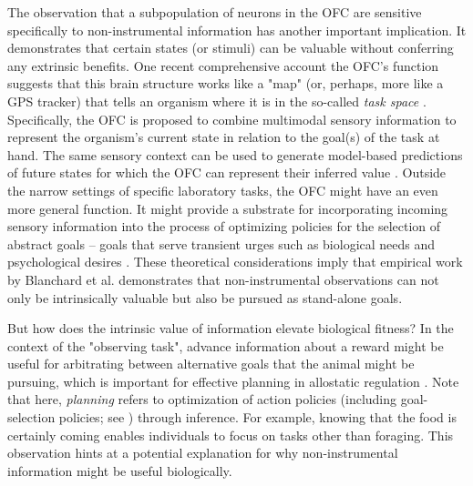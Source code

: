 The observation that a subpopulation of neurons in the \ac{OFC} are sensitive specifically to non-instrumental information \cite{blanchard_orbitofrontal_2015} has another important implication. It demonstrates that certain states (or stimuli) can be valuable without conferring any extrinsic benefits. One recent comprehensive account the \ac{OFC}'s function suggests that this brain structure works like a "map" (or, perhaps, more like a GPS tracker) that tells an organism where it is in the so-called \emph{task space} \cite{wilson_orbitofrontal_2014}. Specifically, the \ac{OFC} is proposed to combine multimodal sensory information to represent the organism's current state in relation to the goal(s) of the task at hand. The same sensory context can be used to generate model-based predictions of future states for which the \ac{OFC} can represent their inferred value \cite[see][for details]{stalnaker_what_2015}. Outside the narrow settings of specific laboratory tasks, the OFC might have an even more general function. It might provide a substrate for incorporating incoming sensory information into the process of optimizing policies for the selection of abstract goals \cite{fine2021prefrontal} -- goals that serve transient urges such as biological needs and psychological desires \cite{juechems_where_2019}. These theoretical considerations imply that empirical work by Blanchard et al. \cite{blanchard_orbitofrontal_2015} demonstrates that non-instrumental observations can not only be intrinsically valuable but also be pursued as stand-alone goals.

But how does the intrinsic value of information elevate biological fitness? In the context of the "observing task", advance information about a reward might be useful for arbitrating between alternative goals that the animal might be pursuing, which is important for effective planning in allostatic regulation \cite{fine2021prefrontal,sterling_allostasis_2012}. Note that here, \emph{planning} refers to optimization of action policies (including goal-selection policies; see \cite{fine2021prefrontal}) through inference. For example, knowing that the food is certainly coming enables individuals to focus on tasks other than foraging. This observation hints at a potential explanation for why non-instrumental information might be useful biologically.

